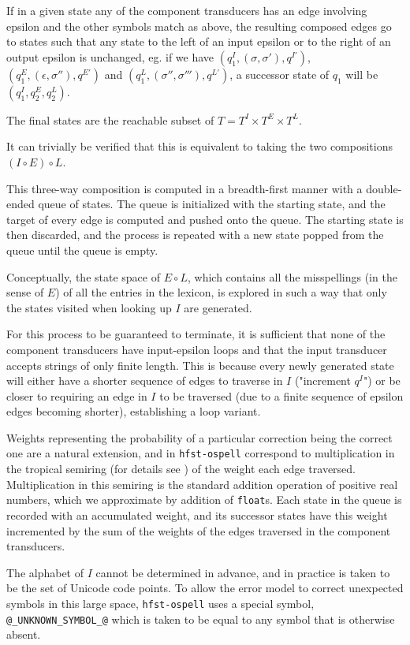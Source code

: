 \documentclass{llncs}
\begin{document}
If in a given state any of the component transducers has an edge involving
epsilon and the other symbols match as above, the resulting composed edges
go to states such that any state to the left of an input epsilon or to the
right of an output epsilon is unchanged, eg. if we have
$(q^I_1, (\sigma, \sigma'), q^{I'})$, $(q^E_1, (\epsilon, \sigma''), q^{E'})$ and
$(q^L_1, (\sigma'', \sigma'''), q^{L'})$, a successor state of $q_1$ will be
$(q^I_1, q^E_2, q^L_2)$.

The final states are the reachable subset of $T = T^I \times T^E \times T^L$.

It can trivially be verified that this is equivalent to taking the two
compositions $(I \circ E) \circ L$.

This three-way composition is computed in a breadth-first manner with a
double-ended queue of states. The queue is initialized with the starting state,
and the target of every edge is computed and pushed onto the
queue. The starting state is then discarded, and the process is repeated
with a new state popped from the queue until the queue is empty.

Conceptually, the state space of $E \circ L$, which contains all the
misspellings (in the sense of $E$) of all the entries in the lexicon, is
explored in such a way that only the states visited when looking up $I$ are
generated.

For this process to be guaranteed to terminate, it is sufficient that none of
the component transducers have input-epsilon loops and that the input
transducer accepts strings of only finite length. This is because every newly
generated state will either have a shorter sequence of edges to traverse in
$I$ ("increment $q^I$") or be closer to requiring an edge in $I$ to be traversed
(due to a finite sequence of epsilon edges becoming shorter), establishing a
loop variant.

Weights representing the probability of a particular correction being the
correct one are a natural extension, and in \verb!hfst-ospell! correspond to
multiplication in the tropical semiring (for details see \cite{openfst/2007})
of the weight each edge
traversed. Multiplication in this semiring is the standard addition operation
of positive real numbers, which we approximate by addition of \verb!float!s.
Each state in the queue is recorded with an accumulated weight, and its
successor states have this weight incremented by the sum of the weights of
the edges traversed in the component transducers.

The alphabet of $I$ cannot be determined in advance, and in practice is taken
to be the set of Unicode code points. To allow the error model to correct
unexpected symbols in this large space, \verb!hfst-ospell! uses a special
symbol, \verb!@_UNKNOWN_SYMBOL_@! which is taken to be equal to any symbol
that is otherwise absent.
\end{document}
